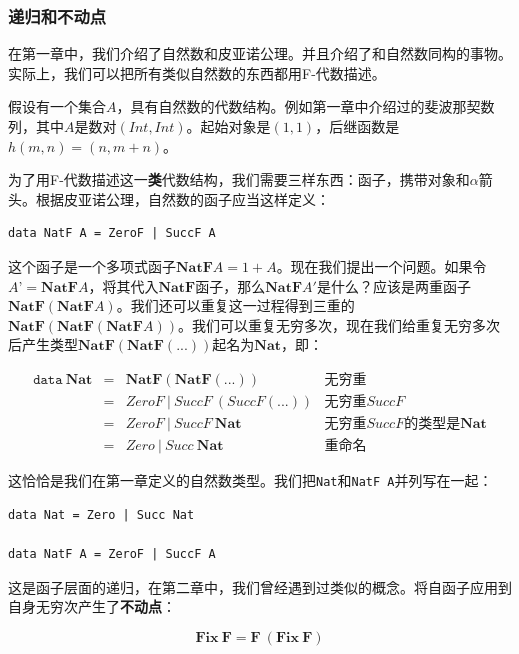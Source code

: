 \documentclass[b5paper]{ctexart}
\begin{document}
\subsubsection{递归和不动点}

在第一章中，我们介绍了自然数和皮亚诺公理。并且介绍了和自然数同构的事物。实际上，我们可以把所有类似自然数的东西都用F-代数描述。

假设有一个集合$A$，具有自然数的代数结构。例如第一章中介绍过的斐波那契数列，其中$A$是数对$(Int, Int)$。起始对象是$(1, 1)$，后继函数是$h(m, n) = (n, m + n)$。

为了用F-代数描述这一\textbf{类}代数结构，我们需要三样东西：函子，携带对象和$\alpha$箭头。根据皮亚诺公理，自然数的函子应当这样定义：

\lstset{frame=none}
\begin{lstlisting}
data NatF A = ZeroF | SuccF A
\end{lstlisting}

这个函子是一个多项式函子$\mathbf{NatF} A = 1 + A$。现在我们提出一个问题。如果令$A’ = \mathbf{NatF} A$，将其代入$\mathbf{NatF}$函子，那么$\mathbf{NatF} A'$是什么？应该是两重函子$\mathbf{NatF}(\mathbf{NatF} A)$。我们还可以重复这一过程得到三重的$\mathbf{NatF}(\mathbf{NatF}(\mathbf{NatF} A))$。我们可以重复无穷多次，现在我们给重复无穷多次后产生类型$\mathbf{NatF}(\mathbf{NatF}(...))$起名为$\mathbf{Nat}$，即：

\[
\begin{array}{rcll}
\texttt{data}\ \mathbf{Nat} & = & \mathbf{NatF}(\mathbf{NatF}(...)) & \text{无穷重} \\
         & = & ZeroF\ |\ SuccF\ (SuccF (...)) & \text{无穷重}SuccF \\
         & = & ZeroF\ |\ SuccF\ \mathbf{Nat} & \text{无穷重}SuccF\text{的类型是}\mathbf{Nat} \\
         & = & Zero\ |\ Succ\ \mathbf{Nat} & \text{重命名}
\end{array}
\]

这恰恰是我们在第一章定义的自然数类型。我们把\texttt{Nat}和\texttt{NatF A}并列写在一起：

\begin{lstlisting}
data Nat = Zero | Succ Nat

data NatF A = ZeroF | SuccF A
\end{lstlisting}

这是函子层面的递归，在第二章中，我们曾经遇到过类似的概念。将自函子应用到自身无穷次产生了\textbf{不动点}：

\[
\mathbf{Fix}\ \mathbf{F} = \mathbf{F}\ (\mathbf{Fix}\ \mathbf{F})
\]
\end{document}
